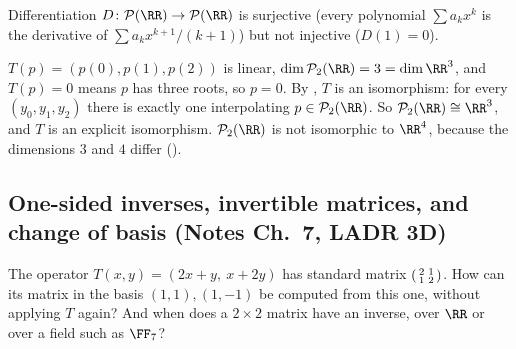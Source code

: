 \documentclass[10pt]{scrartcl}
\newcommand{\PP}{\mathcal P}\newcommand{\LL}{\mathcal L}\newcommand{\MM}{\mathcal M}
\begin{document}
\begin{example*}
  Differentiation $D\colon\PP(\RR)\to\PP(\RR)$ is surjective (every polynomial $\sum a_kx^k$ is the derivative of $\sum a_kx^{k+1}/(k+1)$) but not injective ($D(1)=0$).
\end{example*}

\revisit $T(p)=(p(0),p(1),p(2))$ is linear, $\dim\PP_2(\RR)=3=\dim\RR^3$, and $T(p)=0$ means $p$ has three roots, so $p=0$. By , $T$ is an isomorphism: for every $(y_0,y_1,y_2)$ there is exactly one interpolating $p\in\PP_2(\RR)$. So $\PP_2(\RR)\cong\RR^3$, and $T$ is an explicit isomorphism. $\PP_2(\RR)$ is not isomorphic to $\RR^4$, because the dimensions $3$ and $4$ differ ().

\subsection{One-sided inverses, invertible matrices, and change of basis (Notes Ch.~7, LADR 3D)}

\begin{qbox}
  The operator $T(x,y)=(2x+y,\ x+2y)$ has standard matrix $\begin{psmallmatrix}2&1\\1&2\end{psmallmatrix}$. How can its matrix in the basis $(1,1),(1,-1)$ be computed from this one, without applying $T$ again? And when does a $2\times2$ matrix have an inverse, over $\RR$ or over a field such as $\FF_7$?
\end{qbox}
\end{document}
